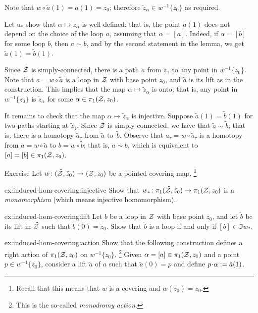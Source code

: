 Note that $w\circ \tilde a(1)=a(1)=z_0$; therefore $\tilde z_\alpha\in w^{-1}\{z_0\}$ as required.

Let us show that $\alpha\mapsto\tilde z_\alpha$ is well-defined;
that is, the point $\tilde a(1)$ does not depend on the choice of the loop $a$, assuming that $\alpha=[a]$.
Indeed, if $\alpha=[b]$ for some loop $b$, then $a\sim b$, and by the second statement in the lemma, we get $\tilde a(1)=\tilde b(1)$.

Since $\tilde{\mathcal{Z}}$ is simply-connected, there is a path $\tilde a$ from $\tilde z_1$ to any point in $w^{-1}\{z_0\}$.
Note that $a=w\circ\tilde a$ is a loop in $\mathcal{Z}$ with base point $z_0$, and $\tilde a$ is its lift as in the construction.
This implies that the map $\alpha\mapsto\tilde z_\alpha$ is onto; that is, any point in $w^{-1}\{z_0\}$ is $\tilde z_\alpha$ for some $\alpha\in\pi_1(\mathcal{Z},z_0)$.

It remains to check that the map $\alpha\mapsto \tilde z_\alpha$ is injective.
Suppose $\tilde a(1)=\tilde b(1)$ for two paths starting at $\tilde z_1$.
Since $\tilde{\mathcal{Z}}$ is simply-connected,
we have that $\tilde a\sim \tilde b$; that is, there is a homotopy $\tilde a_\tau$ from $\tilde a$ to~$\tilde b$.
Observe that $a_\tau=w\circ \tilde a_\tau$ is a homotopy from $a=w\circ \tilde a$ to $b=w\circ \tilde b$;
that is, $a\sim b$, which is equivalent to $[a]=[b]\z\in \pi_1(\c{Z},z_0)$.
\qeds


\begin{thm}{Exercise}\label{ex:induced-hom-covering}
Let $w\colon(\tilde{\mathcal{Z}}, \tilde z_0)\to (\mathcal{Z},z_0)$ be a pointed covering map.%
\footnote{Recall that this means that $w$ is a covering and $w(\tilde z_0)=z_0$.}

\begin{subthm}{ex:induced-hom-covering:injective}
Show that $w_*\colon\pi_1(\tilde{\mathcal{Z}},\tilde z_0)\to \pi_1(\mathcal{Z}, z_0)$ is a \emph{monomorphism} (which means injective homomorphism).
\end{subthm}

\begin{subthm}{ex:induced-hom-covering:lift}
Let $b$ be a loop in $\mathcal{Z}$ with base point $z_0$, and let $\tilde b$ be its lift in $\tilde{\mathcal{Z}}$ such that $\tilde b(0)=\tilde z_0$.
Show that $\tilde b$ is a loop if and only if $[b]\in \Im w_*$.
\end{subthm}

\begin{subthm}{ex:induced-hom-covering:action}
Show that the following construction defines a right action of $\pi_1(\mathcal{Z},z_0)$ on $w^{-1}\{z_0\}$.%
\footnote{This is the so-called \emph{monodromy action}.}
Given $\alpha=[a]\in \pi_1(\mathcal{Z},z_0)$ and a point $p\in w^{-1}\{z_0\}$, consider a lift $\tilde a$ of $a$ such that $\tilde a(0)=p$ and define $p\cdot\alpha \df\tilde a(1)$.
\end{subthm}

\end{thm}

